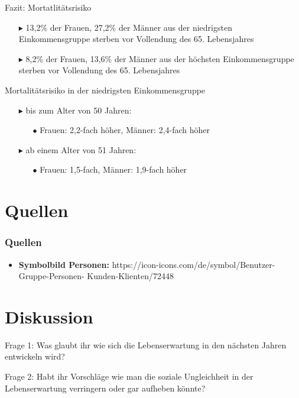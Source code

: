 \documentclass{beamer}
\begin{document}
\begin{frame}{Fazit: Mortatlitätsrisiko}
	\begin{block}{}
		\begin{itemize}
			\item[$\blacktriangleright$] 13,2\% der Frauen, 27,2\% der Männer aus der niedrigsten Einkommensgruppe sterben vor Vollendung des 65. Lebensjahres
			\item[$\blacktriangleright$] 8,2\% der Frauen, 13,6\% der Männer aus der höchsten Einkommensgruppe sterben vor Vollendung des 65. Lebensjahres
		\end{itemize}
	\end{block}
	\pause
	\begin{block}{Mortalitätsrisiko in der niedrigsten Einkommensgruppe}
		\begin{itemize}
			\item[$\blacktriangleright$] bis zum Alter von 50 Jahren:
			\begin{itemize}
				\item[$\bullet$] Frauen: 2,2-fach höher, Männer: 2,4-fach höher
			\end{itemize}
			\item[$\blacktriangleright$] ab einem Alter von 51 Jahren:
			\begin{itemize}
				\item[$\bullet$] Frauen: 1,5-fach, Männer: 1,9-fach höher 
			\end{itemize}
		\end{itemize}
	\end{block}
\end{frame}


\section{Quellen}
\begin{frame}
\frametitle{Quellen}
  \begin{itemize}
    \item \textbf{Symbolbild Personen:}
    https://icon-icons.com/de/symbol/Benutzer-Gruppe-Personen-   Kunden-Klienten/72448
  \end{itemize}

\end{frame}


\section{Diskussion}
\begin{frame}
	\begin{block}{Frage 1:}
		 Was glaubt ihr wie sich die Lebenserwartung in den nächsten Jahren entwickeln wird?
	\end{block}
	\pause  %
	\begin{block}{Frage 2:}
		 Habt ihr Vorschläge wie man die soziale Ungleichheit in der Lebenserwartung verringern oder gar aufheben könnte?
	\end{block}
\end{frame}
\end{document}
